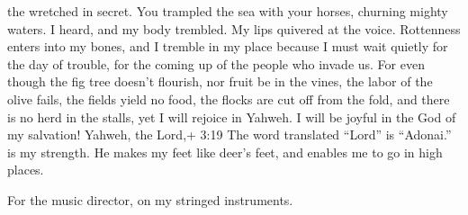 the wretched in secret.  You trampled the sea with your
horses, churning mighty waters.  I heard, and my body
trembled. My lips quivered at the voice. Rottenness enters into my
bones, and I tremble in my place because I must wait quietly for the day
of trouble, for the coming up of the people who invade us. 
For even though the fig tree doesn't flourish, nor fruit be in the
vines, the labor of the olive fails, the fields yield no food, the
flocks are cut off from the fold, and there is no herd in the stalls,
 yet I will rejoice in Yahweh. I will be joyful in the God
of my salvation!  Yahweh, the Lord,+ 3:19 The word
translated ``Lord'' is ``Adonai.'' is my strength. He makes my feet like
deer's feet, and enables me to go in high places.

For the music director, on my stringed instruments.
